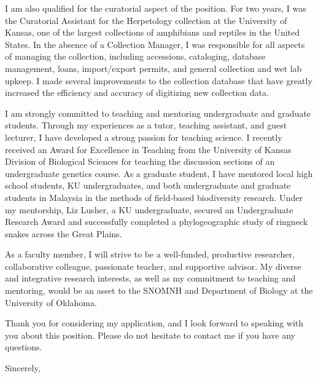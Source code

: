 \documentclass[letterpaper, 10pt]{letter}
\begin{document}
\begin{letter}
I am also qualified for the curatorial aspect of the position.
For two years, I was the Curatorial Assistant for the Herpetology collection at
the University of Kansas, one of the largest collections of amphibians and
reptiles in the United States.
In the absence of a Collection Manager, I was responsible for all aspects of
managing the collection, including accessions, cataloging, database management,
loans, import/export permits, and general collection and wet lab upkeep.
I made several improvements to the collection database that have greatly
increased the efficiency and accuracy of digitizing new collection data.

I am strongly committed to teaching and mentoring undergraduate and graduate
students.
Through my experiences as a tutor, teaching assistant, and guest lecturer, I
have developed a strong passion for teaching science.
I recently received an Award for Excellence in Teaching from the University of
Kansas Division of Biological Sciences for teaching the discussion sections of
an undergraduate genetics course.
As a graduate student, I have mentored local high school students, KU
undergraduates, and both undergraduate and graduate students in Malaysia in the
methods of field-based biodiversity research.
Under my mentorship, Liz Lusher, a KU undergraduate, secured an Undergraduate
Research Award and successfully completed a phylogeographic study of ringneck
snakes across the Great Plains.

As a faculty member, I will strive to be a well-funded, productive researcher,
collaborative colleague, passionate teacher, and supportive advisor.
My diverse and integrative research interests, as well as my commitment to
teaching and mentoring, would be an asset to the SNOMNH and Department of
Biology at the University of Oklahoma.

Thank you for considering my application, and I look forward to speaking with
you about this position.
Please do not hesitate to contact me if you have any questions.

\addtolength{\medskipamount}{-5pt}
\closing{Sincerely,}
\end{letter}
\end{document}
